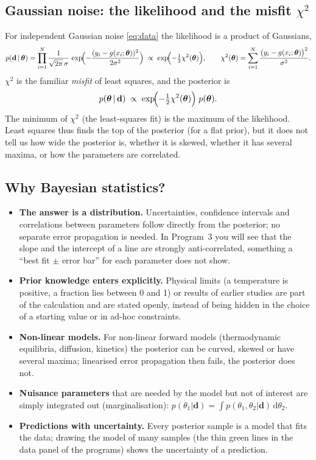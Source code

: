 \documentclass[11pt,a4paper]{article}
\newcommand{\dd}{\mathrm{d}}
\newcommand{\vth}{\boldsymbol{\theta}}
\newcommand{\vd}{\mathbf{d}}
\begin{document}
\subsection{Gaussian noise: the likelihood and the misfit $\chi^2$}
For independent Gaussian noise \eqref{eq:data} the likelihood is a product of Gaussians,
\begin{equation}
  p(\vd\,|\,\vth) = \prod_{i=1}^{N} \frac{1}{\sqrt{2\pi}\,\sigma}\,
     \exp\!\Bigl(-\frac{(y_i-g(x_i;\vth))^2}{2\sigma^2}\Bigr)
  \;\propto\; \exp\!\Bigl(-\tfrac12\chi^2(\vth)\Bigr),\qquad
  \chi^2(\vth) = \sum_{i=1}^{N}\frac{\bigl(y_i-g(x_i;\vth)\bigr)^2}{\sigma^2}.
  \label{eq:chi2}
\end{equation}
$\chi^2$ is the familiar \emph{misfit} of least squares, and the posterior is
\begin{equation}
  p(\vth\,|\,\vd) \;\propto\; \exp\!\Bigl(-\tfrac12\chi^2(\vth)\Bigr)\;p(\vth).
  \label{eq:post}
\end{equation}
The minimum of $\chi^2$ (the least-squares fit) is the maximum of the likelihood. Least squares thus finds the
top of the posterior (for a flat prior), but it does not tell us how wide the posterior is, whether it is
skewed, whether it has several maxima, or how the parameters are correlated.

\subsection{Why Bayesian statistics?}
\begin{itemize}
\item \textbf{The answer is a distribution.} Uncertainties, confidence intervals and correlations between
  parameters follow directly from the posterior; no separate error propagation is needed. In
  Program~3 you will see that the slope and the intercept of a line are strongly anti-correlated, something a
  ``best fit $\pm$ error bar'' for each parameter does not show.
\item \textbf{Prior knowledge enters explicitly.} Physical limits (a temperature is positive, a fraction lies
  between 0 and 1) or results of earlier studies are part of the calculation and are stated openly, instead of
  being hidden in the choice of a starting value or in ad-hoc constraints.
\item \textbf{Non-linear models.} For non-linear forward models (thermodynamic equilibria, diffusion,
  kinetics) the posterior can be curved, skewed or have several maxima; linearised error propagation then fails,
  the posterior does not.
\item \textbf{Nuisance parameters} that are needed by the model but not of interest are simply integrated out
  (marginalisation): $p(\theta_1|\vd)=\int p(\theta_1,\theta_2|\vd)\,\dd\theta_2$.
\item \textbf{Predictions with uncertainty.} Every posterior sample is a model that fits the data; drawing the
  model of many samples (the thin green lines in the data panel of the programs) shows the uncertainty of a
  prediction.
\end{itemize}
\end{document}
